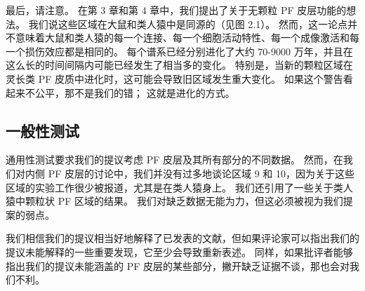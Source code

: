 \par 
最后，请注意。 在第 3 章和第 4 章中，我们提出了关于无颗粒 PF 皮层功能的想法。 我们说这些区域在大鼠和类人猿中是同源的（见图 2.1）。 然而，这一论点并不意味着大鼠和类人猿的每一个连接、每一个细胞活动特性、每一个成像激活和每一个损伤效应都是相同的。 每个谱系已经分别进化了大约 70-9000 万年，并且在这么长的时间间隔内可能已经发生了相当多的变化。 特别是，当新的颗粒区域在灵长类 PF 皮质中进化时，这可能会导致旧区域发生重大变化。 如果这个警告看起来不公平，那不是我们的错； 这就是进化的方式。
\subsection{一般性测试}
通用性测试要求我们的提议考虑 PF 皮层及其所有部分的不同数据。 然而，在我们对内侧 PF 皮层的讨论中，我们并没有过多地谈论区域 9 和 10，因为关于这些区域的实验工作很少被报道，尤其是在类人猿身上。 我们还引用了一些关于类人猿中颗粒状 PF 区域的结果。 我们对缺乏数据无能为力，但这必须被视为我们提案的弱点。
\par 
我们相信我们的提议相当好地解释了已发表的文献，但如果评论家可以指出我们的提议未能解释的一些重要发现，它至少会导致重新表述。 同样，如果批评者能够指出我们的提议未能涵盖的 PF 皮层的某些部分，撇开缺乏证据不谈，那也会对我们不利。